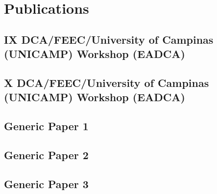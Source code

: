 \chapter{Publications}


\section{IX DCA/FEEC/University of Campinas (UNICAMP) Workshop (EADCA)}



\section{X DCA/FEEC/University of Campinas (UNICAMP) Workshop (EADCA)}



\section{Generic Paper 1}


\section{Generic Paper 2}


\section{Generic Paper 3}



